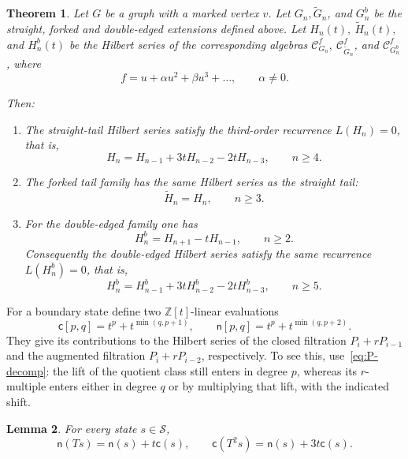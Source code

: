 \documentclass[reqno]{article}
\theoremstyle{plain} %
\newtheorem{theorem}{Theorem}[section]
\newtheorem{lemma}[theorem]{Lemma}
\theoremstyle{definition}
\theoremstyle{remark}
\newcommand{\Z}{{\mathbb{Z}}}
\newcommand {\CC}{\mathscr{C}}
\numberwithin{equation}{section}
\begin{document}
\begin{theorem}
  \label{th:4t-rec}
  Let \(G\) be a graph with a marked vertex \(v\). Let   \(G_n, \widetilde{G}_n\),  and  \(G^b_n \) be
the  straight, forked and double-edged extensions defined above.
  Let \(H_n(t), \ \widetilde{H}_n(t),\)  and   \(H^b_n(t)\)  be the Hilbert series of the corresponding algebras \(\CC^f_{G_n}, \ \CC^f_{\widetilde{G}_n}\),  and  \(\CC^f_{G^b_n}\),
  where
  \begin{equation}
    \label{eq:func}
 f=u+\alpha u^2+\beta u^3+\ldots, \qquad \alpha\ne 0.
\end{equation}

Then:
  \begin{enumerate}
  \item[\textup{(i)}]
    The straight-tail Hilbert series satisfy the third-order recurrence
    $L(H_n)=0$, that is,
    \begin{equation}
      \label{eq:4t-rec}
    H_n=H_{n-1}+3tH_{n-2}-2tH_{n-3}, \qquad n\ge 4.
  \end{equation}

  \item[\textup{(ii)}]
    The forked tail family has the same Hilbert series as the straight tail:
    \[
      \widetilde H_n=H_n,  \qquad n\ge3.
    \]

  \item[\textup{(iii)}]
    For the double-edged family one has
    \[
      H_n^b=H_{n+1}-tH_{n-1}, \qquad   n\ge2.
    \]
    Consequently the double-edged Hilbert series satisfy the same recurrence
    \(L(H^b_n)=0\), that is,
    \[
      H_n^b=H_{n-1}^b+3tH_{n-2}^b-2tH_{n-3}^b,
      \qquad  n\ge 5.
    \]
  \end{enumerate}
\end{theorem}


For a boundary state define two \(\Z[t]\)-linear evaluations
\begin{equation}
\label{eq:boundary-evaluations}
\mathsf c[p,q]=t^p+t^{\min(q,p+1)},\qquad
\mathsf n[p,q]=t^p+t^{\min(q,p+2)}.
\end{equation}
They give its contributions to the Hilbert series of the closed filtration
\(P_i+rP_{i-1}\) and the augmented filtration \(P_i+rP_{i-2}\),
respectively. To see this, use~\eqref{eq:P-decomp}: the lift of the
quotient class still enters in degree \(p\), whereas its \(r\)-multiple
enters either in degree \(q\) or by multiplying that lift, with the
indicated shift.

\begin{lemma}
\label{lem:tail-evaluations}
For every state \(s\in\mathcal S\),
\begin{equation}
\label{eq:tail-evaluation-identities}
\mathsf n(Ts)=\mathsf n(s)+t\mathsf c(s),\qquad
\mathsf c(T^2s)=\mathsf n(s)+3t\mathsf c(s).
\end{equation}
\end{lemma}
\end{document}
